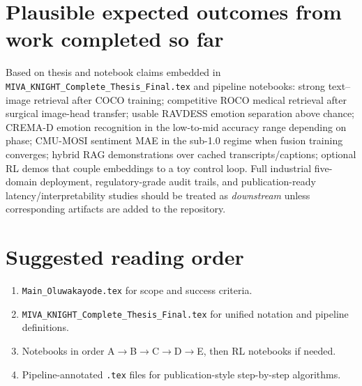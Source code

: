 \documentclass[11pt,a4paper]{article}
\begin{document}
\section{Plausible expected outcomes from work completed so far}
Based on thesis and notebook claims embedded in \texttt{MIVA\_KNIGHT\_Complete\_Thesis\_Final.tex} and pipeline notebooks: strong text--image retrieval after COCO training; competitive ROCO medical retrieval after surgical image-head transfer; usable RAVDESS emotion separation above chance; CREMA-D emotion recognition in the low-to-mid accuracy range depending on phase; CMU-MOSI sentiment MAE in the sub-1.0 regime when fusion training converges; hybrid RAG demonstrations over cached transcripts/captions; optional RL demos that couple embeddings to a toy control loop. Full industrial five-domain deployment, regulatory-grade audit trails, and publication-ready latency/interpretability studies should be treated as \emph{downstream} unless corresponding artifacts are added to the repository.

\section{Suggested reading order}
\begin{enumerate}[leftmargin=1.5em]
  \item \texttt{Main\_Oluwakayode.tex} for scope and success criteria.
  \item \texttt{MIVA\_KNIGHT\_Complete\_Thesis\_Final.tex} for unified notation and pipeline definitions.
  \item Notebooks in order A$\rightarrow$B$\rightarrow$C$\rightarrow$D$\rightarrow$E, then RL notebooks if needed.
  \item Pipeline-annotated \texttt{.tex} files for publication-style step-by-step algorithms.
\end{enumerate}
\end{document}
